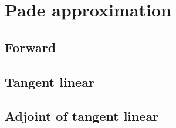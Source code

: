 %
\section{Pade approximation}
\label{sec:pade_approximation}


\subsection{Forward}
\label{sec:pade_approximation-forward}


%
\subsection{Tangent linear}
\label{sec:pade_approximation-tangent_linear}


%
\subsection{Adjoint of tangent linear}
\label{sec:pade_approximation-adjoint_of_tangent_linear}
